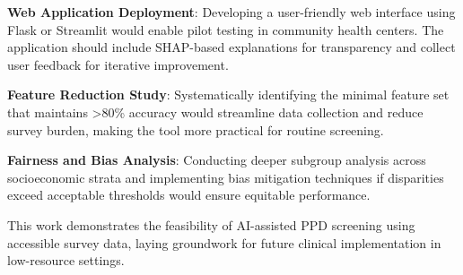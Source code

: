 \textbf{Web Application Deployment}: Developing a user-friendly web interface using Flask or Streamlit would enable pilot testing in community health centers. The application should include SHAP-based explanations for transparency and collect user feedback for iterative improvement.

\textbf{Feature Reduction Study}: Systematically identifying the minimal feature set that maintains >80\% accuracy would streamline data collection and reduce survey burden, making the tool more practical for routine screening.

\textbf{Fairness and Bias Analysis}: Conducting deeper subgroup analysis across socioeconomic strata and implementing bias mitigation techniques if disparities exceed acceptable thresholds would ensure equitable performance.

This work demonstrates the feasibility of AI-assisted PPD screening using accessible survey data, laying groundwork for future clinical implementation in low-resource settings.


